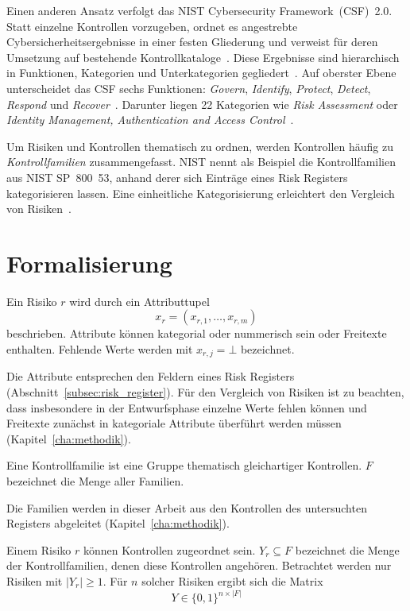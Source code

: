 Einen anderen Ansatz verfolgt das NIST Cybersecurity Framework~(CSF)~2.0.
Statt einzelne Kontrollen vorzugeben, ordnet es angestrebte Cybersicherheitsergebnisse in einer festen Gliederung und verweist für deren Umsetzung auf bestehende Kontrollkataloge~\cite[S.~i, 1]{nistcsf2}.
Diese Ergebnisse sind hierarchisch in Funktionen, Kategorien und Unterkategorien gegliedert~\cite[S.~3]{nistcsf2}.
Auf oberster Ebene unterscheidet das CSF sechs Funktionen: \emph{Govern}, \emph{Identify}, \emph{Protect}, \emph{Detect}, \emph{Respond} und \emph{Recover}~\cite[S.~3--4]{nistcsf2}.
Darunter liegen 22 Kategorien wie \emph{Risk Assessment} oder \emph{Identity Management, Authentication and Access Control}~\cite[S.~15]{nistcsf2}.

Um Risiken und Kontrollen thematisch zu ordnen, werden Kontrollen häufig zu \emph{Kontrollfamilien} zusammengefasst.
NIST nennt als Beispiel die Kontrollfamilien aus NIST SP~800~53, anhand derer sich Einträge eines Risk Registers kategorisieren lassen.
Eine einheitliche Kategorisierung erleichtert den Vergleich von Risiken~\cite[S.~12]{nistir8286}.

\section{Formalisierung}\label{sec:formal}
\begin{definition}\label{def:risiko}
Ein Risiko $r$ wird durch ein Attributtupel
\[
x_r = (x_{r,1}, \ldots, x_{r,m})
\]
beschrieben.
Attribute können kategorial oder nummerisch sein oder Freitexte enthalten.
Fehlende Werte werden mit $x_{r,j} = \bot$ bezeichnet.
\end{definition}
Die Attribute entsprechen den Feldern eines Risk Registers (Abschnitt~\ref{subsec:risk_register}).
Für den Vergleich von Risiken ist zu beachten, dass insbesondere in der Entwurfsphase einzelne Werte fehlen können und Freitexte zunächst in kategoriale Attribute überführt werden müssen (Kapitel~\ref{cha:methodik}).

\begin{definition}[Kontrollfamilie]\label{def:familie}
Eine Kontrollfamilie ist eine Gruppe thematisch gleichartiger Kontrollen.
$F$ bezeichnet die Menge aller Familien.
\end{definition}
Die Familien werden in dieser Arbeit aus den Kontrollen des untersuchten Registers abgeleitet (Kapitel~\ref{cha:methodik}).

\begin{definition}[Zielgröße]\label{def:ziel}
Einem Risiko $r$ können Kontrollen zugeordnet sein. $Y_r \subseteq F$ bezeichnet die Menge der Kontrollfamilien, denen diese Kontrollen angehören.
Betrachtet werden nur Risiken mit $|Y_r| \geq 1$.
Für $n$ solcher Risiken ergibt sich die Matrix
\[
Y \in {\{0,1\}}^{n \times |F|}
\]
\end{definition}

